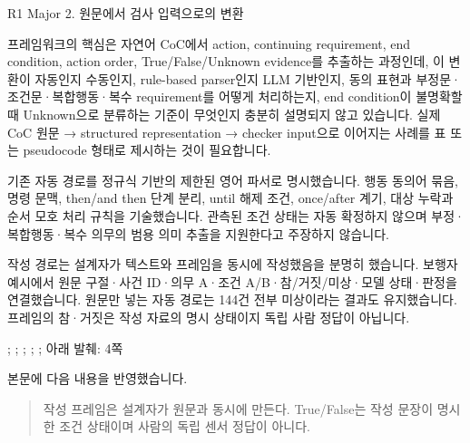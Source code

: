 \clearpage

\begin{reviewitem}{R1 Major 2. 원문에서 검사 입력으로의 변환}

\begin{reviewercomment}

프레임워크의 핵심은 자연어 CoC에서 action, continuing requirement, end condition, action order, True/False/Unknown evidence를 추출하는 과정인데, 이 변환이 자동인지 수동인지, rule-based parser인지 LLM 기반인지, 동의 표현과 부정문·조건문·복합행동·복수 requirement를 어떻게 처리하는지, end condition이 불명확할 때 Unknown으로 분류하는 기준이 무엇인지 충분히 설명되지 않고 있습니다. 실제 CoC 원문 → structured representation → checker input으로 이어지는 사례를 표 또는 pseudocode 형태로 제시하는 것이 필요합니다.

\end{reviewercomment}

\begin{authorresponse}

기존 자동 경로를 정규식 기반의 제한된 영어 파서로 명시했습니다. 행동 동의어 묶음, 명령 문맥, then/and then 단계 분리, until 해제 조건, once/after 계기, 대상 누락과 순서 모호 처리 규칙을 기술했습니다. 관측된 조건 상태는 자동 확정하지 않으며 부정·복합행동·복수 의무의 범용 의미 추출을 지원한다고 주장하지 않습니다.

작성 경로는 설계자가 텍스트와 프레임을 동시에 작성했음을 분명히 했습니다. 보행자 예시에서 원문 구절·사건 ID·의무 A·조건 A/B·참/거짓/미상·모델 상태·판정을 연결했습니다. 원문만 넣는 자동 경로는 144건 전부 미상이라는 결과도 유지했습니다. 프레임의 참·거짓은 작성 자료의 명시 상태이지 독립 사람 정답이 아닙니다.

\end{authorresponse}

\begin{manuscriptrevision}{; ; ; ; ; 아래 발췌: 4쪽}

본문에 다음 내용을 반영했습니다.

\begin{quote}

작성 프레임은 설계자가 원문과 동시에 만든다. True/False는 작성 문장이 명시한 조건 상태이며 사람의 독립 센서 정답이 아니다.

\end{quote}

\end{manuscriptrevision}

\end{reviewitem}

